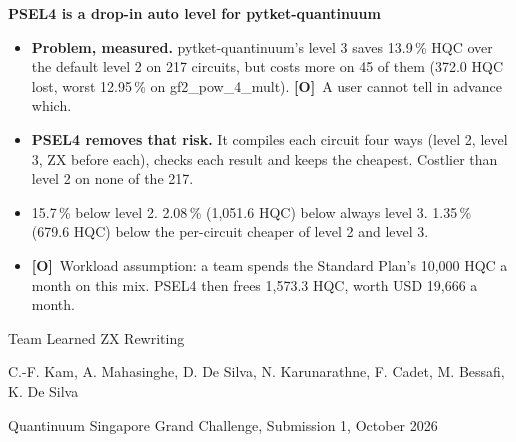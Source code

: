 \documentclass[aspectratio=169,11pt]{beamer}
\newcommand{\Otag}{{\color{opinion}\textbf{[O]}}}
\begin{document}
\begin{frame}[plain]
  \vfill
  {\color{accent}\LARGE\bfseries PSEL4 is a drop-in auto level for pytket-quantinuum\par}
  \vspace{0.4cm}
  \begin{itemize}\setlength{\itemsep}{3pt}
    \item \textbf{Problem, measured.} pytket-quantinuum's level 3 saves 13.9\,\% HQC over the default level 2 on 217 circuits, but costs more on 45 of them (372.0 HQC lost, worst 12.95\,\% on gf2\_pow\_4\_mult). \Otag\ A user cannot tell in advance which.
    \item \textbf{PSEL4 removes that risk.} It compiles each circuit four ways (level 2, level 3, ZX before each), checks each result and keeps the cheapest. Costlier than level 2 on none of the 217.
    \item 15.7\,\% below level 2. 2.08\,\% (1,051.6 HQC) below always level 3. 1.35\,\% (679.6 HQC) below the per-circuit cheaper of level 2 and level 3.
    \item \Otag\ Workload assumption: a team spends the Standard Plan's 10,000 HQC a month on this mix. PSEL4 then frees 1,573.3 HQC, worth USD 19,666 a month.
  \end{itemize}
  \vspace{0.35cm}
  {\large Team Learned ZX Rewriting\par}
  \vspace{0.15cm}
  C.-F. Kam, A. Mahasinghe, D. De Silva, N. Karunarathne, F. Cadet, M. Bessafi, K. De Silva\par
  \vspace{0.3cm}
  {\color{muted}Quantinuum Singapore Grand Challenge, Submission 1, October 2026\par}
  \vfill
\end{frame}
\end{document}
